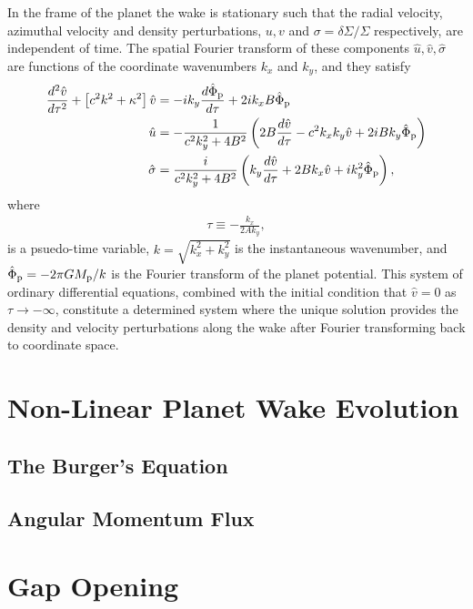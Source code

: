 In the frame of the planet the wake is stationary such that the radial velocity, azimuthal velocity and density perturbations, $u, v$ and $\sigma = \delta \Sigma / \Sigma$ respectively, are independent of time.
The spatial Fourier transform of these components $\hat{u}, \hat{v}, \hat{\sigma}$ are functions of the coordinate wavenumbers $k_x$ and $k_y$, and they satisfy \citep{goldreich1978,goldreich1980}
\begin{align}
    \frac{d^2 \hat{v}}{d \tau^2} + \left[ c^2 k^2 + \kappa^2 \right]\hat{v} &= -i k_y \frac{d \hat{\Phi}_{\rm p}}{d\tau} + 2i k_x B \hat{\Phi}_{\rm p} \\
    \hat{u} &= - \frac{1}{c^2 k_y^2 + 4 B^2} \left( 2 B \frac{d \hat{v}}{d\tau} - c^2 k_x k_y \hat{v} + 2iBk_y \hat{\Phi}_{\rm p} \right) \\
    \hat{\sigma} &= \frac{i}{c^2 k_y^2 + 4 B^2} \left( k_y \frac{d \hat{v}}{d \tau} + 2B k_x \hat{v} + i k_y^2 \hat{\Phi}_{\rm p} \right),
\end{align}
where
\begin{align}
    \tau \equiv -\frac{k_x}{2 A k_y},
\end{align}
is a psuedo-time variable, $k=\sqrt{k_x^2 + k_y^2}$ is the instantaneous wavenumber, and $\hat{\Phi}_{\rm p}=-2\pi G M_{\rm p} / k$ is the Fourier transform of the planet potential.
This system of ordinary differential equations, combined with the initial condition that $\hat{v}=0$ as $\tau \rightarrow - \infty$, constitute a determined system where the unique solution provides the density and velocity perturbations along the wake after Fourier transforming back to coordinate space.


\section{Non-Linear Planet Wake Evolution}

\subsection{The Burger's Equation}

\subsection{Angular Momentum Flux}

\section{Gap Opening} \label{sec:gap_opening}

